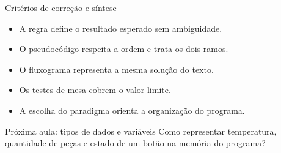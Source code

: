 \begin{frame}[t]{Critérios de correção e síntese}
\begin{itemize}
\item A regra define o resultado esperado sem ambiguidade.
\item O pseudocódigo respeita a ordem e trata os dois ramos.
\item O fluxograma representa a mesma solução do texto.
\item Os testes de mesa cobrem o valor limite.
\item A escolha do paradigma orienta a organização do programa.
\end{itemize}
\begin{block}{Próxima aula: tipos de dados e variáveis}
Como representar temperatura, quantidade de peças e estado de um botão na memória do programa?
\end{block}
\end{frame}
